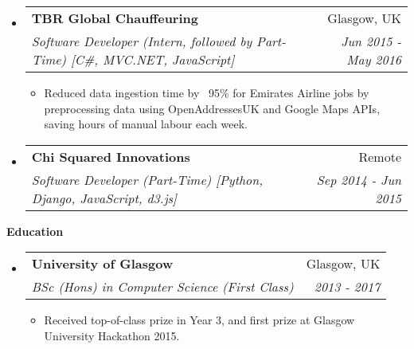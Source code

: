 \documentclass[letterpaper,11pt]{article}
\makeatletter
\newcommand{\resitem}[1]{\item #1 \vspace{-2pt}}
\newcommand{\resheading}[1]{{\large \colorbox{mygrey}{\begin{minipage}{\textwidth}{\textbf{#1 \vphantom{p\^{E}}}}\end{minipage}}}}
\newcommand{\ressubheading}[4]{
\begin{tabular*}{7.0in}{l@{\extracolsep{\fill}}r}
	\textbf{#1} & #2 \\
	\textit{#3} & \textit{#4} \\
\end{tabular*}\vspace{-6pt}}
\makeatother
\begin{document}
\begin{itemize}
		\item
		\ressubheading{TBR Global Chauffeuring}{Glasgow, UK}{Software Developer (Intern, followed by Part-Time) [C\#, MVC.NET, JavaScript]}{Jun 2015 - May 2016}
		\begin{itemize}
			\resitem{Reduced data ingestion time by ~95\% for Emirates Airline jobs by preprocessing data using OpenAddressesUK and Google Maps APIs, saving hours of manual labour each week.}
		\end{itemize}

		\item
		\ressubheading{Chi Squared Innovations}{Remote}{Software Developer (Part-Time) [Python, Django, JavaScript, d3.js]}{Sep 2014 - Jun 2015}

	\end{itemize}

	\resheading{Education}
	\begin{itemize}
		\item
		\ressubheading{University of Glasgow}{Glasgow, UK}{BSc (Hons) in Computer Science (First Class)}{2013 - 2017}
		\begin{itemize}
			\resitem{Received top-of-class prize in Year 3, and first prize at Glasgow University Hackathon 2015.}
		\end{itemize}
	\end{itemize}
\end{document}

